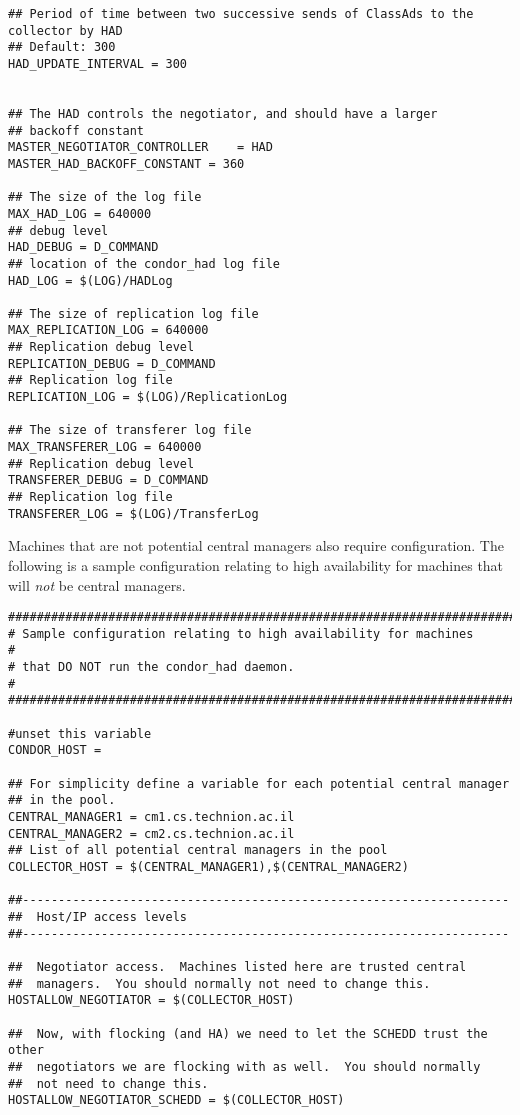 \begin{verbatim}
## Period of time between two successive sends of ClassAds to the collector by HAD
## Default: 300
HAD_UPDATE_INTERVAL = 300


## The HAD controls the negotiator, and should have a larger
## backoff constant
MASTER_NEGOTIATOR_CONTROLLER	= HAD
MASTER_HAD_BACKOFF_CONSTANT	= 360

## The size of the log file
MAX_HAD_LOG = 640000
## debug level 
HAD_DEBUG = D_COMMAND
## location of the condor_had log file
HAD_LOG = $(LOG)/HADLog

## The size of replication log file
MAX_REPLICATION_LOG = 640000
## Replication debug level 
REPLICATION_DEBUG = D_COMMAND
## Replication log file
REPLICATION_LOG = $(LOG)/ReplicationLog

## The size of transferer log file
MAX_TRANSFERER_LOG = 640000
## Replication debug level 
TRANSFERER_DEBUG = D_COMMAND
## Replication log file
TRANSFERER_LOG = $(LOG)/TransferLog

\end{verbatim}
\normalsize

Machines that are not potential central managers also 
require configuration.
The following is a sample configuration relating to
high availability for machines that will \emph{not} be central managers.

\footnotesize
\begin{verbatim}
##########################################################################
# Sample configuration relating to high availability for machines        # 
# that DO NOT run the condor_had daemon.                                 #
##########################################################################

#unset this variable
CONDOR_HOST =

## For simplicity define a variable for each potential central manager
## in the pool. 
CENTRAL_MANAGER1 = cm1.cs.technion.ac.il
CENTRAL_MANAGER2 = cm2.cs.technion.ac.il
## List of all potential central managers in the pool
COLLECTOR_HOST = $(CENTRAL_MANAGER1),$(CENTRAL_MANAGER2)

##--------------------------------------------------------------------
##  Host/IP access levels
##--------------------------------------------------------------------

##  Negotiator access.  Machines listed here are trusted central
##  managers.  You should normally not need to change this.
HOSTALLOW_NEGOTIATOR = $(COLLECTOR_HOST)

##  Now, with flocking (and HA) we need to let the SCHEDD trust the other 
##  negotiators we are flocking with as well.  You should normally 
##  not need to change this.
HOSTALLOW_NEGOTIATOR_SCHEDD = $(COLLECTOR_HOST) 
\end{verbatim}
\normalsize

